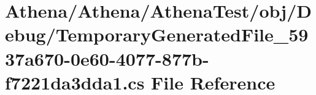 \hypertarget{_athena_test_2obj_2_debug_2_temporary_generated_file__5937a670-0e60-4077-877b-f7221da3dda1_8cs}{\section{Athena/\-Athena/\-Athena\-Test/obj/\-Debug/\-Temporary\-Generated\-File\-\_\-5937a670-\/0e60-\/4077-\/877b-\/f7221da3dda1.cs File Reference}
\label{_athena_test_2obj_2_debug_2_temporary_generated_file__5937a670-0e60-4077-877b-f7221da3dda1_8cs}
}
